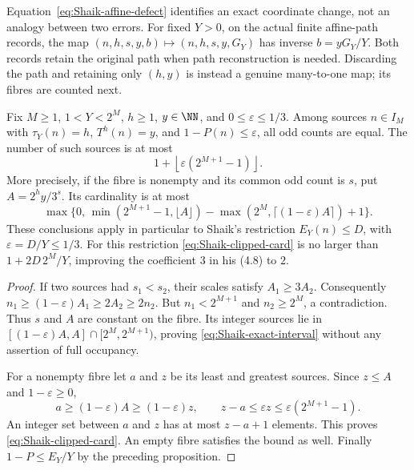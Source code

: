 Equation~\eqref{eq:Shaik-affine-defect} identifies an exact coordinate
change, not an analogy between two errors. For fixed \(Y>0\), on the
actual finite affine-path records, the map
\((n,h,s,y,b)\mapsto(n,h,s,y,G_Y)\) has inverse \(b=yG_Y/Y\).
Both records retain the original path when path reconstruction is needed.
Discarding the path and retaining only \((h,y)\) is instead a genuine
many-to-one map; its fibres are counted next.

\begin{proposition}
\label{prop:Shaik-clipped-fibre}
Fix \(M\ge1\), \(1<Y<2^M\), \(h\ge1\), \(y\in\NN\), and
\(0\le\varepsilon\le1/3\). Among sources \(n\in I_M\) with
\(\tau_Y(n)=h\), \(T^h(n)=y\), and \(1-P(n)\le\varepsilon\),
all odd counts are equal. The number of such sources is at most
\begin{equation}\label{eq:Shaik-clipped-card}
 1+\left\lfloor\varepsilon(2^{M+1}-1)\right\rfloor.
\end{equation}
More precisely, if the fibre is nonempty and its common odd count is \(s\),
put \(A=2^h y/3^s\). Its cardinality is at most
\begin{equation}\label{eq:Shaik-exact-interval}
 \max\{0,\,
 \min(2^{M+1}-1,\lfloor A\rfloor)
 -\max(2^M,\lceil(1-\varepsilon)A\rceil)+1\}.
\end{equation}
These conclusions apply in particular to Shaik's restriction
\(E_Y(n)\le D\), with \(\varepsilon=D/Y\le1/3\).
For this restriction \eqref{eq:Shaik-clipped-card} is no larger than
\(1+2D\,2^M/Y\), improving the coefficient \(3\) in his (4.8) to \(2\).
\end{proposition}
\begin{proof}
If two sources had \(s_1<s_2\), their scales satisfy \(A_1\ge3A_2\).
Consequently
\(n_1\ge(1-\varepsilon)A_1\ge2A_2\ge2n_2\).
But \(n_1<2^{M+1}\) and \(n_2\ge2^M\), a contradiction. Thus \(s\)
and \(A\) are constant on the fibre. Its integer sources lie in
\([(1-\varepsilon)A,A]\cap[2^M,2^{M+1})\), proving
\eqref{eq:Shaik-exact-interval} without any assertion of full occupancy.

For a nonempty fibre let \(a\) and \(z\) be its least and greatest
sources. Since \(z\le A\) and \(1-\varepsilon\ge0\),
\[
 a\ge(1-\varepsilon)A\ge(1-\varepsilon)z,\qquad
 z-a\le\varepsilon z\le\varepsilon(2^{M+1}-1).
\]
An integer set between \(a\) and \(z\) has at most \(z-a+1\) elements.
This proves \eqref{eq:Shaik-clipped-card}. An empty fibre satisfies the
bound as well. Finally \(1-P\le E_Y/Y\) by the preceding proposition.
\end{proof}

